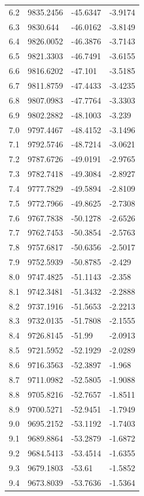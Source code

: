 \begin{table}[H]
\begin{tabular}{llll}
6.2 & 9835.2456 & -45.6347 & -3.9174 \\
6.3 & 9830.644 & -46.0162 & -3.8149 \\
6.4 & 9826.0052 & -46.3876 & -3.7143 \\
6.5 & 9821.3303 & -46.7491 & -3.6155 \\
6.6 & 9816.6202 & -47.101 & -3.5185 \\
6.7 & 9811.8759 & -47.4433 & -3.4235 \\
6.8 & 9807.0983 & -47.7764 & -3.3303 \\
6.9 & 9802.2882 & -48.1003 & -3.239 \\
7.0 & 9797.4467 & -48.4152 & -3.1496 \\
7.1 & 9792.5746 & -48.7214 & -3.0621 \\
7.2 & 9787.6726 & -49.0191 & -2.9765 \\
7.3 & 9782.7418 & -49.3084 & -2.8927 \\
7.4 & 9777.7829 & -49.5894 & -2.8109 \\
7.5 & 9772.7966 & -49.8625 & -2.7308 \\
7.6 & 9767.7838 & -50.1278 & -2.6526 \\
7.7 & 9762.7453 & -50.3854 & -2.5763 \\
7.8 & 9757.6817 & -50.6356 & -2.5017 \\
7.9 & 9752.5939 & -50.8785 & -2.429 \\
8.0 & 9747.4825 & -51.1143 & -2.358 \\
8.1 & 9742.3481 & -51.3432 & -2.2888 \\
8.2 & 9737.1916 & -51.5653 & -2.2213 \\
8.3 & 9732.0135 & -51.7808 & -2.1555 \\
8.4 & 9726.8145 & -51.99 & -2.0913 \\
8.5 & 9721.5952 & -52.1929 & -2.0289 \\
8.6 & 9716.3563 & -52.3897 & -1.968 \\
8.7 & 9711.0982 & -52.5805 & -1.9088 \\
8.8 & 9705.8216 & -52.7657 & -1.8511 \\
8.9 & 9700.5271 & -52.9451 & -1.7949 \\
9.0 & 9695.2152 & -53.1192 & -1.7403 \\
9.1 & 9689.8864 & -53.2879 & -1.6872 \\
9.2 & 9684.5413 & -53.4514 & -1.6355 \\
9.3 & 9679.1803 & -53.61 & -1.5852 \\
9.4 & 9673.8039 & -53.7636 & -1.5364 \\

\end{tabular}
\end{table}
